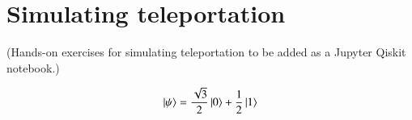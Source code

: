 \section{Simulating teleportation}

(Hands-on exercises for simulating teleportation to be added as a Jupyter Qiskit notebook.)


\newpage
\begin{exercises}
\begin{equation*}
\left| \psi \right\rangle = \frac{\sqrt{3}}{2}\left| 0 \right\rangle + \frac{1}{2}\left| 1 \right\rangle
\end{equation*}


\end{exercises}

